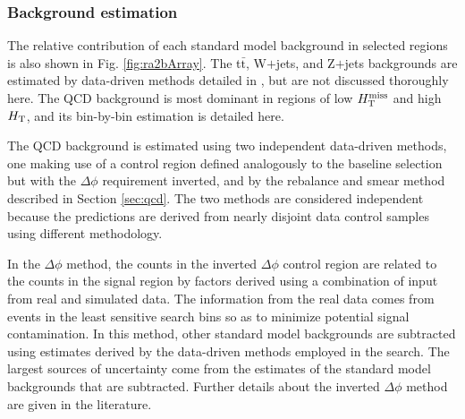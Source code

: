 \subsubsection{Background estimation}
The relative contribution of each standard model background in selected regions is also shown in Fig. \ref{fig:ra2bArray}. The t$\bar{\text{t}}$, W$+$jets, and Z$+$jets backgrounds are estimated by data-driven methods detailed in  \cite{Khachatryan:2016kdk}, but are not discussed thoroughly here. The QCD background is most dominant in regions of low $H_{\text{T}}^{\rm miss}$ and high $H_{\rm T}$, and its bin-by-bin estimation is detailed here.

The QCD background is estimated using two independent data-driven methods, one making use of a control region defined analogously to the baseline selection but with the $\Delta\phi$ requirement inverted, and by the rebalance and smear method described in Section \ref{sec:qcd}. The two methods are considered independent because the predictions are derived from nearly disjoint data control samples using different methodology. 

In the $\Delta\phi$ method, the counts in the inverted $\Delta\phi$ control region are related to the counts in the signal region by factors derived using a combination of input from real and simulated data. The information from the real data comes from events in the least sensitive search bins so as to minimize potential signal contamination. In this method, other standard model backgrounds are subtracted using estimates derived by the data-driven methods employed in the search. The largest sources of uncertainty come from the estimates of the standard model backgrounds that are subtracted. Further details about the inverted $\Delta\phi$ method are given in the literature.

